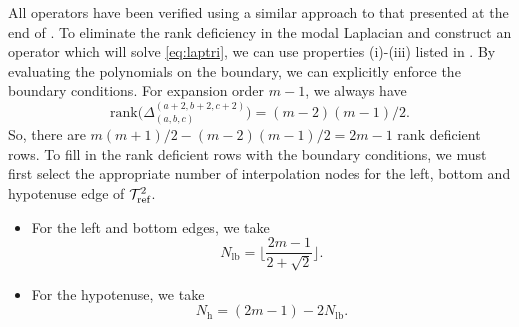 All operators have been verified using a similar approach to that presented at the end of . To eliminate the rank deficiency in the modal Laplacian and construct an operator which will solve \eqref{eq:laptri}, we can use properties (i)-(iii) listed in . By evaluating the polynomials on the boundary, we can explicitly enforce the boundary conditions. For expansion order $m-1$, we always have $$\text{rank}\big(\Delta_{(a,b,c)}^{(a+2,b+2,c+2)}\big) = (m-2)(m-1)/2.$$ So, there are $m(m+1)/2-(m-2)(m-1)/2 = 2m-1$ rank deficient rows. To fill in the rank deficient rows with the boundary conditions, we must first select the appropriate number of interpolation nodes for the left, bottom and hypotenuse edge of $\mathcal{T}_{\text{ref}}^2$. 
\begin{itemize}
	\item For the left and bottom edges, we take $$N_\text{lb} = \Big\lfloor \frac{2m-1}{2+\sqrt{2}} \Big\rfloor.$$
	\item For the hypotenuse, we take $$N_{\text{h}} = (2m-1)-2N_{\text{lb}}.$$
\end{itemize}

